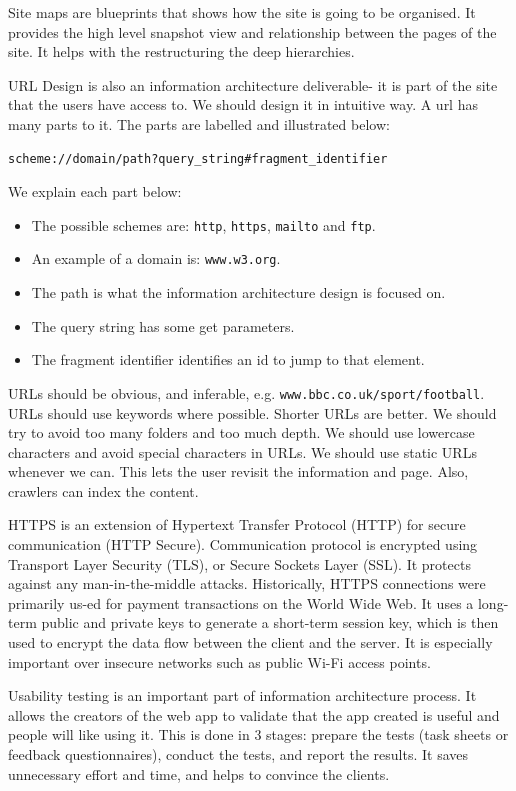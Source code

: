 \documentclass[a4paper, openany]{memoir}
\begin{document}
Site maps are blueprints that shows how the site is going to be organised. It provides the high level snapshot view and relationship between the pages of the site. It helps with the restructuring the deep hierarchies.

URL Design is also an information architecture deliverable- it is part of the site that the users have access to. We should design it in intuitive way. A url has many parts to it. The parts are labelled and illustrated below:
\begin{verbatim}
scheme://domain/path?query_string#fragment_identifier
\end{verbatim}
We explain each part below:
\begin{itemize}
    \item The possible schemes are: \texttt{http}, \texttt{https}, \texttt{mailto} and \texttt{ftp}.
    \item An example of a domain is: \texttt{www.w3.org}.
    \item The path is what the information architecture design is focused on.
    \item The query string has some get parameters.
    \item The fragment identifier identifies an id to jump to that element.
\end{itemize}
URLs should be obvious, and inferable, e.g. \texttt{www.bbc.co.uk/sport/football}. URLs should use keywords where possible. Shorter URLs are better. We should try to avoid too many folders and too much depth. We should use lowercase characters and avoid special characters in URLs. We should use static URLs whenever we can. This lets the user revisit the information and page. Also, crawlers can index the content.

HTTPS is an extension of Hypertext Transfer Protocol (HTTP) for secure communication (HTTP Secure). Communication protocol is encrypted using Transport Layer Security (TLS), or Secure Sockets Layer (SSL). It protects against any man-in-the-middle attacks. Historically, HTTPS connections were primarily us-ed for payment transactions on the World Wide Web. It uses a long-term public and private keys to generate a short-term session key, which is then used to encrypt the data flow between the client and the server. It is especially important over insecure networks such as public Wi-Fi access points.

Usability testing is an important part of information architecture process. It allows the creators of the web app to validate that the app created is useful and people will like using it. This is done in 3 stages: prepare the tests (task sheets or feedback questionnaires), conduct the tests, and report the results. It saves unnecessary effort and time, and helps to convince the clients.
\end{document}

